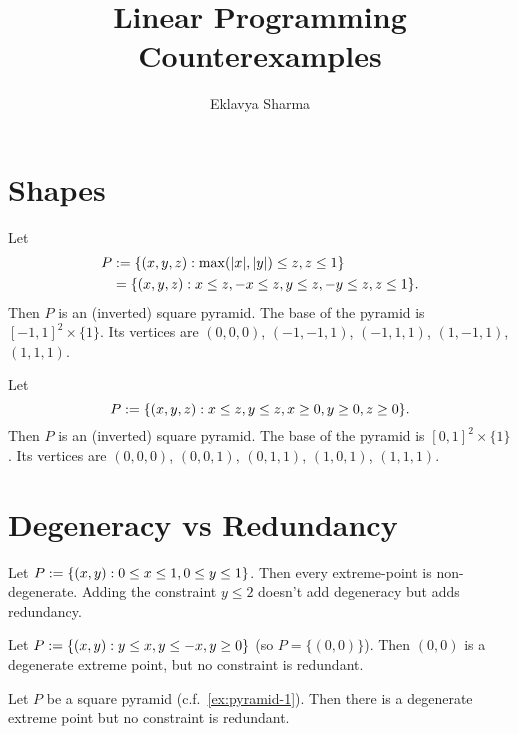 \documentclass[a4paper,12pt,fleqn]{article}
\author{Eklavya Sharma}
\date{\empty}
\title{Linear Programming Counterexamples}
\begin{document}
\maketitle
\setlength{\parskip}{0.2em}

\section{Shapes}

\begin{example}
\label{ex:pyramid-1}
Let
\begin{align*}
P &:= \{(x, y, z): \max(|x|, |y|) \le z, z \le 1\}
\\ &= \{(x, y, z): x \le z, -x \le z, y \le z, -y \le z, z \le 1\}.
\end{align*}
Then $P$ is an (inverted) square pyramid.
The base of the pyramid is $[-1, 1]^2 \times \{1\}$.
Its vertices are $(0, 0, 0)$, $(-1, -1, 1)$, $(-1, 1, 1)$, $(1, -1, 1)$, $(1, 1, 1)$.
\end{example}

\begin{example}
\label{ex:pyramid-2}
Let
\[ P := \{(x, y, z): x \le z, y \le z, x \ge 0, y \ge 0, z \ge 0\}. \]
Then $P$ is an (inverted) square pyramid.
The base of the pyramid is $[0, 1]^2 \times \{1\}$.
Its vertices are $(0, 0, 0)$, $(0, 0, 1)$, $(0, 1, 1)$, $(1, 0, 1)$, $(1, 1, 1)$.
\end{example}

\section{Degeneracy vs Redundancy}

\begin{example}
Let $P := \{(x, y): 0 \le x \le 1, 0 \le y \le 1\}$.
Then every extreme-point is non-degenerate.
Adding the constraint $y \le 2$ doesn't add degeneracy but adds redundancy.
\end{example}

\begin{example}
Let $P := \{(x, y): y \le x, y \le -x, y \ge 0\}$ (so $P = \{(0, 0)\}$).
Then $(0, 0)$ is a degenerate extreme point, but no constraint is redundant.
\end{example}

\begin{example}
Let $P$ be a square pyramid (c.f.~\cref{ex:pyramid-1}).
Then there is a degenerate extreme point but no constraint is redundant.
\end{example}

\end{document}
